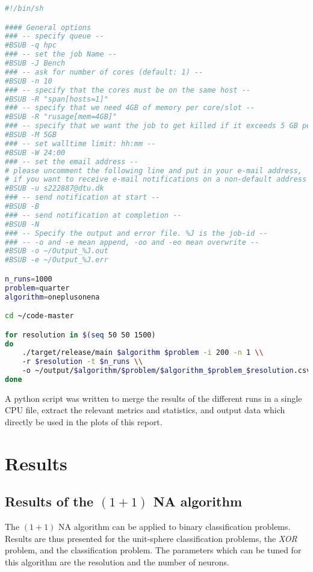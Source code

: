 \begin{lstlisting}[language=bash, caption=Example of a job script, label=lst:job_script]
#!/bin/sh

#### General options
### -- specify queue --
#BSUB -q hpc
### -- set the job Name --
#BSUB -J Bench
### -- ask for number of cores (default: 1) --
#BSUB -n 10
### -- specify that the cores must be on the same host --
#BSUB -R "span[hosts=1]"
### -- specify that we need 4GB of memory per core/slot --
#BSUB -R "rusage[mem=4GB]"
### -- specify that we want the job to get killed if it exceeds 5 GB per core/slot --
#BSUB -M 5GB
### -- set walltime limit: hh:mm --
#BSUB -W 24:00
### -- set the email address --
# please uncomment the following line and put in your e-mail address,
# if you want to receive e-mail notifications on a non-default address
#BSUB -u s222887@dtu.dk
### -- send notification at start --
#BSUB -B
### -- send notification at completion --
#BSUB -N
### -- Specify the output and error file. %J is the job-id --
### -- -o and -e mean append, -oo and -eo mean overwrite --
#BSUB -o ~/Output_%J.out
#BSUB -e ~/Output_%J.err

n_runs=1000
problem=quarter
algorithm=oneplusonena

cd ~/code-master

for resolution in $(seq 50 50 1500)
do
    ./target/release/main $algorithm $problem -i 200 -n 1 \\
    -r $resolution -t $n_runs \\
    -o ~/output/$algorithm/$problem/$algorithm_$problem_$resolution.csv
done
\end{lstlisting}

A python script was written to merge the results of the different runs in a single CPU file, extract the relevant metrics and statistics, and output data which directly be used
in the  plots of this report.

\section{Results}

\subsection{Results of the $(1 + 1)$ NA algorithm}

The $(1 + 1)$ NA algorithm can be applied to binary classification problems. Results are thus presented for the unit-sphere classification problems, the \textit{XOR} problem, and
the  classification problem.
The parameters which can be tuned for this algorithm are the resolution and the number of neurons.

